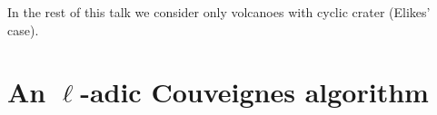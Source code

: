 \documentclass[10pt,a4paper]{beamer}
\theoremstyle{plain}
\theoremstyle{definition}
\theoremstyle{definition}
\theoremstyle{definition}
\theoremstyle{definition}
\theoremstyle{remark}
\theoremstyle{remark}
\begin{document}
\begin{frame}
\begin{figure}[h]
\begin{center}
		\end{center} 
		\end{figure}
In the rest of this talk we consider only volcanoes with cyclic crater (Elikes' case).
\end{frame}


\section{An $\ell$-adic Couveignes algorithm}
\end{document}
